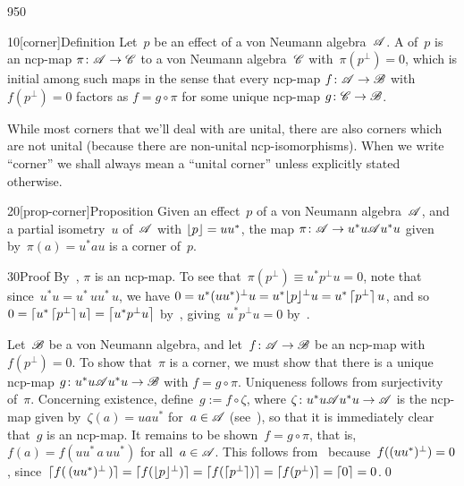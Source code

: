 \begin{parsec}{950}%
\begin{point}{10}[corner]{Definition}%
Let~$p$ be an effect of a von Neumann algebra~$\mathscr{A}$.
A %
of~$p$ is an
ncp-map $\pi\colon \mathscr{A}\to\mathscr{C}$
to a von Neumann algebra~$\mathscr{C}$
with~$\pi(p^\perp)=0$,
which is initial among such maps 
in the sense
that every ncp-map $f\colon \mathscr{A}\to\mathscr{B}$
with~$f(p^\perp)=0$
factors as $f=g\circ\pi$
for some unique ncp-map $g\colon \mathscr{C}\to\mathscr{B}$.

While most corners
that we'll deal with are unital,
there are also corners which are not unital
(because there are non-unital
ncp-isomorphisms).
When we write ``corner'' we shall
always mean a ``unital corner''%
unless explicitly stated otherwise.
\end{point}
\begin{point}{20}[prop-corner]{Proposition}%
Given an effect~$p$ of a von Neumann algebra~$\mathscr{A}$,
and a partial isometry~$u$ of~$\mathscr{A}$
with $\left\lfloor p\right\rfloor=uu^*$,
the map $\pi\colon \mathscr{A}\to u^*u \mathscr{A} u^*u$
given by~$\pi(a)=u^*au$ is a corner of~$p$.
\begin{point}{30}{Proof}%
By~, $\pi$ is an ncp-map.
To see that~$\pi(p^\perp)\equiv u^*p^\perp u =0$,
note that since~$u^*u=u^*\,u u^*\,u$,
we have $0=u^*(uu^*)^\perp u =u^*\smash{\left\lfloor p\right\rfloor}^\perp u
= u^*\left\lceil\smash{p^\perp}\right\rceil u$,
and so
$0 = \left\lceil u^* \left\lceil\smash{p^\perp}\right\rceil u \right\rceil
=\left\lceil u^* p^\perp u\right\rceil$
by~,
giving~$u^*p^\perp u=0$
by~.


Let~$\mathscr{B}$ be a von Neumann algebra,
and let~$f\colon \mathscr{A}\to\mathscr{B}$ be an ncp-map
with $f(p^\perp)=0$.
To show that~$\pi$ is a corner,
we must show that there is a unique ncp-map
$g\colon u^*u \mathscr{A} u^*u\to\mathscr{B}$
with $f=g\circ \pi$.
Uniqueness follows
from surjectivity of~$\pi$.
Concerning existence,
define~$g:= f\circ \zeta$,
where $\zeta\colon  u^*u\mathscr{A} u^*u\to \mathscr{A}$
is the ncp-map given by~$\zeta(a)=uau^*$
for~$a\in\mathscr{A}$ (see~),
so that it is immediately clear that~$g$ is an ncp-map.
It remains to be shown~$f=g\circ \pi$,
that is,
$f(a)=f(uu^*\,a\,uu^*)$ for all~$a\in\mathscr{A}$.
This follows from~
because~$f(\smash{(uu^*)^\perp})=0$,
since~$\left\lceil\smash{f(\,\smash{(uu^*)^\perp}\,)}\right\rceil
=\left\lceil\smash{f(\smash{\left\lfloor p\right\rfloor}^\perp)}\right\rceil
=\left\lceil\smash{f(\left\lceil\smash{p^\perp}\right\rceil)}\right\rceil
= \left\lceil\smash{f(p^\perp)}\right\rceil=\left\lceil0\right\rceil=0$.\qed
\end{point}
\end{point}
\end{parsec}
